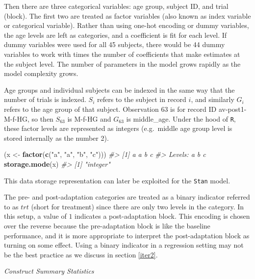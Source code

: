 \documentclass[11pt, oneside, openany]{scrbook}
\newenvironment{Shaded}{\begin{snugshade}}{\end{snugshade}}
\newcommand{\CommentTok}[1]{\textcolor[rgb]{0.56,0.35,0.01}{\textit{#1}}}
\newcommand{\KeywordTok}[1]{\textcolor[rgb]{0.13,0.29,0.53}{\textbf{#1}}}
\newcommand{\NormalTok}[1]{#1}
\newcommand{\StringTok}[1]{\textcolor[rgb]{0.31,0.60,0.02}{#1}}
\begin{document}
Then there are three categorical variables: age group, subject ID, and trial (block). The first two are treated as factor variables (also known as index variable or categorical variable). Rather than using one-hot encoding or dummy variables, the age levels are left as categories, and a coefficient is fit for each level. If dummy variables were used for all 45 subjects, there would be 44 dummy variables to work with times the number of coefficients that make estimates at the subject level. The number of parameters in the model grows rapidly as the model complexity grows.

Age groups and individual subjects can be indexed in the same way that the number of trials is indexed. \(S_i\) refers to the subject in record \(i\), and similarly \(G_i\) refers to the age group of that subject. Observation \(63\) is for record ID av-post1-M-f-HG, so then \(S_{63}\) is M-f-HG and \(G_{63}\) is middle\_age. Under the hood of \texttt{R}, these factor levels are represented as integers (e.g.~middle age group level is stored internally as the number 2).


\begin{Shaded}
\begin{Highlighting}[]
\NormalTok{(x <-}\StringTok{ }\KeywordTok{factor}\NormalTok{(}\KeywordTok{c}\NormalTok{(}\StringTok{"a"}\NormalTok{, }\StringTok{"a"}\NormalTok{, }\StringTok{"b"}\NormalTok{, }\StringTok{"c"}\NormalTok{)))}
\CommentTok{#> [1] a a b c}
\CommentTok{#> Levels: a b c}
\KeywordTok{storage.mode}\NormalTok{(x)}
\CommentTok{#> [1] "integer"}
\end{Highlighting}
\end{Shaded}


This data storage representation can later be exploited for the \texttt{Stan} model.

The pre- and post-adaptation categories are treated as a binary indicator referred to as \(trt\) (short for treatment) since there are only two levels in the category. In this setup, a value of \(1\) indicates a post-adaptation block. This encoding is chosen over the reverse because the pre-adaptation block is like the baseline performance, and it is more appropriate to interpret the post-adaptation block as turning on some effect. Using a binary indicator in a regression setting may not be the best practice as we discuss in section \ref{iter2}.

\emph{Construct Summary Statistics}
\end{document}
